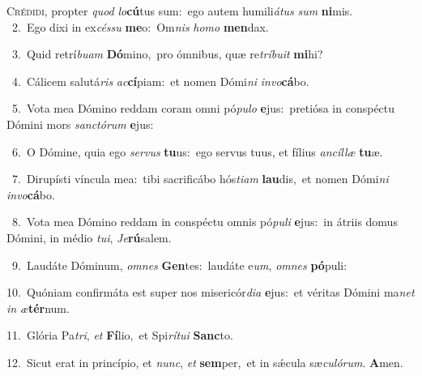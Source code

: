 \lettrine{\initial\textcolor{\initialcolor}{C}}{rédidi,} propter \textit{quod} \textit{lo}\-\textbf{cú}tus sum:~\star ego autem humili\-\textit{á}\-\textit{tus} \textit{sum} \textbf{ni}\-mis.\\
{\numbfont\textcolor{\numbcolor}{~2.}}~Ego dixi in ex\-\textit{cés}\-\textit{su} \textbf{me}\-o:~\star Om\textit{nis} \textit{ho}\-\textit{mo} \textbf{men}\-dax.\par
{\numbfont\textcolor{\numbcolor}{~3.}}~Quid retrí\-\textit{bu}\-\textit{am} \textbf{Dó}\-mino,~\star pro ómnibus, quæ re\-\textit{trí}\-\textit{bu}\textit{it} \textbf{mi}\-hi?\par
{\numbfont\textcolor{\numbcolor}{~4.}}~Cálicem salutá\textit{ris} \textit{ac}\-\textbf{cí}piam:~\star et nomen Dómi\textit{ni} \textit{in}\-\textit{vo}\textbf{cá}bo.\par
{\numbfont\textcolor{\numbcolor}{~5.}}~Vota mea Dómino reddam coram omni pó\-\textit{pu}\-\textit{lo} \textbf{e}\-jus:~\star pretiósa in conspéctu Dómini mors \textit{sanc}\-\textit{tó}\textit{rum} \textbf{e}\-jus:\par
{\numbfont\textcolor{\numbcolor}{~6.}}~O Dómine, quia ego \textit{ser}\-\textit{vus} \textbf{tu}\-us:~\star ego servus tuus, et fílius \textit{an}\-\textit{cíl}\textit{læ} \textbf{tu}\-æ.\par
{\numbfont\textcolor{\numbcolor}{~7.}}~Dirupísti víncula mea:~\dagger tibi sacrificábo hós\-\textit{ti}\-\textit{am} \textbf{lau}\-dis,~\star et nomen Dómi\textit{ni} \textit{in}\-\textit{vo}\textbf{cá}bo.\par
{\numbfont\textcolor{\numbcolor}{~8.}}~Vota mea Dómino reddam in conspéctu omnis pó\-\textit{pu}\-\textit{li} \textbf{e}\-jus:~\star in átriis domus Dómini, in médio \textit{tu}\-\textit{i}, \textit{Je}\-\textbf{rú}salem.\par
{\numbfont\textcolor{\numbcolor}{~9.}}~Laudáte Dóminum, \textit{om}\-\textit{nes} \textbf{Gen}\-tes:~\star laudáte e\-\textit{um}\-, \textit{om}\-\textit{nes} \textbf{pó}\-puli:\par
{\numbfont\textcolor{\numbcolor}{10.}}~Quóniam confirmáta est super nos misericór\-\textit{di}\-\textit{a} \textbf{e}\-jus:~\star et véritas Dómini ma\textit{net} \textit{in} \textit{æ}\-\textbf{tér}num.\par
{\numbfont\textcolor{\numbcolor}{11.}}~Glória Pa\-\textit{tri}\-, \textit{et} \textbf{Fí}\-lio,~\star et Spi\-\textit{rí}\-\textit{tu}\textit{i} \textbf{Sanc}\-to.\par
{\numbfont\textcolor{\numbcolor}{12.}}~Sicut erat in princípio, et \textit{nunc}\-, \textit{et} \textbf{sem}\-per,~\star et in sǽcula sæ\-\textit{cu}\-\textit{ló}\textit{rum}. \textbf{A}\-men.\par
